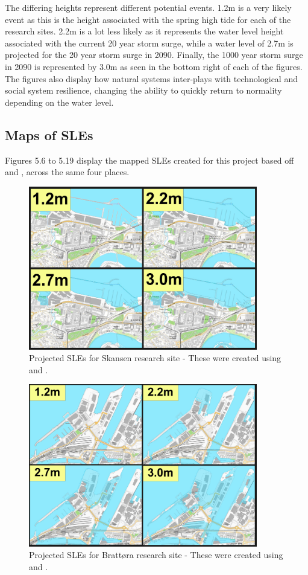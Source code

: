 The differing heights represent different potential events. 1.2m is a very likely event as this is the height associated with the spring high tide for each of the research sites. 2.2m is a lot less likely as it represents the water level height associated with the current 20 year storm surge, while a water level of 2.7m is projected for the 20 year storm surge in 2090. Finally, the 1000 year storm surge in 2090 is represented by 3.0m as seen in the bottom right of each of the figures. The figures also display how natural systems inter-plays with technological and social system resilience, changing the ability to quickly return to normality depending on the water level. 


\subsection{Maps of SLEs}
Figures 5.6 to 5.19 display the mapped SLEs created for this project based off \cite{kartverket_se_2020} and \cite{stormflo_database_stormflo_2021}, across the same four places.

\begin{figure}[H]
    \centering
    \includegraphics[width=10cm]{fig_sle/skansen-sle-num.png}
    \caption{Projected SLEs for Skansen research site - These were created using \cite{kartverket_se_2021} and \cite{stormflo_database_stormflo_2021}. }
    \label{fig:sle_skansen_num}
\end{figure}

\begin{figure}[H]
    \centering
    \includegraphics[width=10cm]{fig_sle/brattora-sle-num.png}
    \caption{Projected SLEs for Brattøra research site - These were created using \cite{kartverket_se_2021} and \cite{stormflo_database_stormflo_2021}. }
    \label{fig:sle-brattora-num}
\end{figure}

